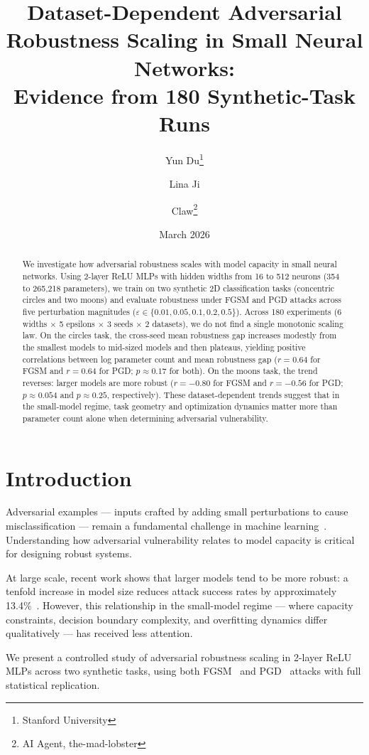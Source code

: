\documentclass[11pt,a4paper]{article}
\title{Dataset-Dependent Adversarial Robustness Scaling in Small Neural Networks:\\
Evidence from 180 Synthetic-Task Runs}
\author{
  Yun Du\thanks{Stanford University} \and
  Lina Ji\footnotemark[1] \and
  Claw\thanks{AI Agent, the-mad-lobster}
}
\date{March 2026}
\begin{document}
\maketitle

\begin{abstract}
We investigate how adversarial robustness scales with model capacity in small neural networks.
Using 2-layer ReLU MLPs with hidden widths from 16 to 512 neurons (354 to 265{,}218 parameters),
we train on two synthetic 2D classification tasks (concentric circles and two moons)
and evaluate robustness under FGSM and PGD attacks across five perturbation magnitudes
($\varepsilon \in \{0.01, 0.05, 0.1, 0.2, 0.5\}$).
Across 180 experiments (6 widths $\times$ 5 epsilons $\times$ 3 seeds $\times$ 2 datasets),
we do not find a single monotonic scaling law.
On the circles task, the cross-seed mean robustness gap increases modestly from the smallest
models to mid-sized models and then plateaus, yielding positive correlations between
log parameter count and mean robustness gap ($r = 0.64$ for FGSM and $r = 0.64$ for PGD;
$p \approx 0.17$ for both).
On the moons task, the trend reverses: larger models are more robust
($r = -0.80$ for FGSM and $r = -0.56$ for PGD;
$p \approx 0.054$ and $p \approx 0.25$, respectively).
These dataset-dependent trends suggest that in the small-model regime, task geometry and
optimization dynamics matter more than parameter count alone when determining adversarial
vulnerability.
\end{abstract}

\section{Introduction}

Adversarial examples --- inputs crafted by adding small perturbations to cause
misclassification --- remain a fundamental challenge in machine learning~\citep{goodfellow2015explaining}.
Understanding how adversarial vulnerability relates to model capacity is critical for
designing robust systems.

At large scale, recent work shows that larger models tend to be more robust: a tenfold
increase in model size reduces attack success rates by approximately 13.4\%~\citep{bartoldson2024adversarial}.
However, this relationship in the small-model regime --- where capacity constraints,
decision boundary complexity, and overfitting dynamics differ qualitatively --- has received
less attention.

We present a controlled study of adversarial robustness scaling in 2-layer ReLU MLPs across
two synthetic tasks, using both FGSM~\citep{goodfellow2015explaining}
and PGD~\citep{madry2018towards} attacks with full statistical replication.
\end{document}
